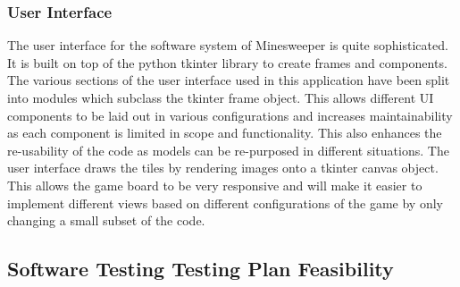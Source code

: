 \documentclass[12pt, a4]{report}
\begin{document}
\subsubsection{User Interface}
The user interface for the software system of Minesweeper is quite sophisticated. It is built on top of the python tkinter library to create frames and components. The various sections of the user interface used in this application have been split into modules which subclass the tkinter frame object. This allows different UI components to be laid out in various configurations and increases maintainability as each component is limited in scope and functionality. This also enhances the re-usability of the code as models can be re-purposed in different situations. The user interface draws the tiles by rendering images onto a tkinter canvas object. This allows the game board to be very responsive and will make it easier to implement different views based on different configurations of the game by only changing a small subset of the code.

\newpage
\subsection{Software Testing \textbar{} Testing Plan \textbar{} Feasibility}
\par 
\end{document}
